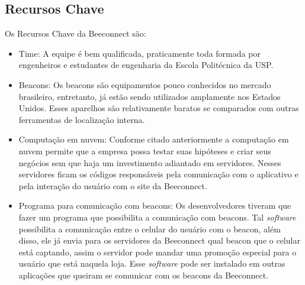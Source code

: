 \subsection{Recursos Chave}
\label{cha:recursos_chave}
Os Recursos Chave da Beeconnect são:
\begin{itemize}
\item Time: A equipe é bem qualificada, praticamente toda formada por engenheiros e estudantes de engenharia da Escola Politécnica da USP.
\item Beacons: Os beacons são equipamentos pouco conhecidos no mercado brasileiro, entretanto, já estão sendo utilizados amplamente nos Estados Unidos. Esses aparelhos são relativamente baratos se comparados com outras ferramentas de localização interna. 
\item Computação em nuvem: Conforme citado anteriormente a computação em nuvem permite que a empresa possa testar suas hipóteses e criar seus negócios sem que haja um investimento adiantado em servidores. Nesses servidores ficam os códigos responsáveis pela comunicação com o aplicativo e pela interação do usuário com o site da Beeconnect.
\item Programa para comunicação com beacons: Os desenvolvedores tiveram que fazer um programa que possibilita a comunicação com beacons. Tal \textit{software} possibilita a comunicação entre o celular do usuário com o beacon, além disso, ele já envia para os servidores da Beeconnect qual beacon que o celular está captando, assim o servidor pode mandar uma promoção especial para o usuário que está naquela loja. Esse \textit{software} pode ser instalado em outras aplicações que queiram se comunicar com os beacons da Beeconnect.
\end{itemize}

